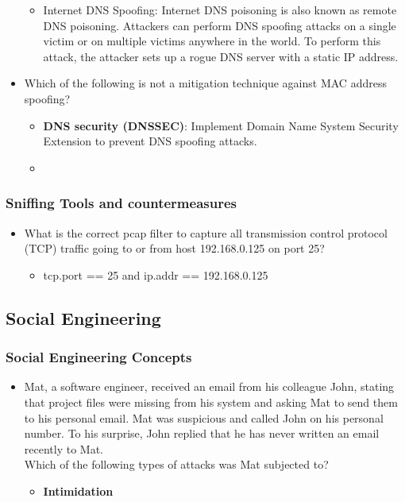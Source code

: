 \begin{itemize}
\begin{itemize}
        \item Internet DNS Spoofing: Internet DNS poisoning is also known as remote DNS poisoning. Attackers can perform DNS spoofing attacks on a single victim or on multiple victims anywhere in the world. To perform this attack, the attacker sets up a rogue DNS server with a static IP address.
    \end{itemize}
    \item Which of the following is not a mitigation technique against MAC address spoofing?
    \begin{itemize}
        \item \textbf{DNS security (DNSSEC)}: Implement Domain Name System Security Extension to prevent DNS spoofing attacks.
        \item 
    \end{itemize}
\end{itemize}

\subsubsection{Sniffing Tools and countermeasures}
\begin{itemize}
    \item What is the correct pcap filter to capture all transmission control protocol (TCP) traffic going to or from host 192.168.0.125 on port 25?
    \begin{itemize}
        \item tcp.port == 25 and ip.addr == 192.168.0.125
    \end{itemize}
\end{itemize}

\subsection{Social Engineering}
\subsubsection{Social Engineering Concepts}
\begin{itemize}
    \item Mat, a software engineer, received an email from his colleague John, stating that project files were missing from his system and asking Mat to send them to his personal email. Mat was suspicious and called John on his personal number. To his surprise, John replied that he has never written an email recently to Mat.\\ Which of the following types of attacks was Mat subjected to?
    \begin{itemize}
        \item \textbf{Intimidation}
    \end{itemize}
\end{itemize}
